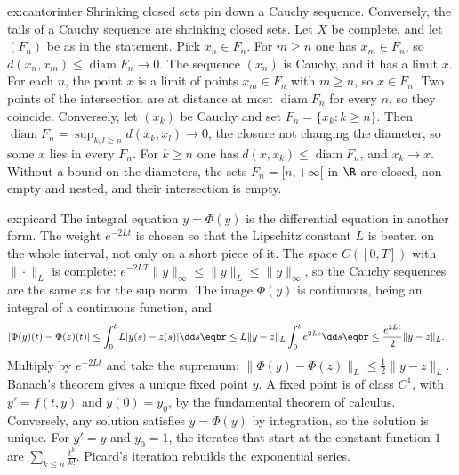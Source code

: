 \begin{solution}{ex:cantorinter}
\idea Shrinking closed sets pin down a Cauchy sequence. Conversely, the tails of a Cauchy sequence are shrinking closed sets.
\writeup Let $X$ be complete, and let $(F_n)$ be as in the statement. Pick $x_n\in F_n$. For $m\ge n$ one has $x_m\in F_n$, so $d(x_n,x_m)\le\operatorname{diam}F_n\to0$. The sequence $(x_n)$ is Cauchy, and it has a limit $x$. For each $n$, the point $x$ is a limit of points $x_m\in F_n$ with $m\ge n$, so $x\in F_n$. Two points of the intersection are at distance at most $\operatorname{diam}F_n$ for every $n$, so they coincide. Conversely, let $(x_k)$ be Cauchy and set $F_n=\overline{\{x_k:k\ge n\}}$. Then $\operatorname{diam}F_n=\sup_{k,l\ge n}d(x_k,x_l)\to0$, the closure not changing the diameter, so some $x$ lies in every $F_n$. For $k\ge n$ one has $d(x,x_k)\le\operatorname{diam}F_n$, and $x_k\to x$. Without a bound on the diameters, the sets $F_n=[n,+\infty[$ in $\R$ are closed, non-empty and nested, and their intersection is empty.
\end{solution}

\begin{solution}{ex:picard}
\idea The integral equation $y=\Phi(y)$ is the differential equation in another form. The weight $e^{-2Lt}$ is chosen so that the Lipschitz constant $L$ is beaten on the whole interval, not only on a short piece of it.
\writeup The space $C([0,T])$ with $\|\cdot\|_L$ is complete: $e^{-2LT}\|y\|_\infty\le\|y\|_L\le\|y\|_\infty$, so the Cauchy sequences are the same as for the sup norm. The image $\Phi(y)$ is continuous, being an integral of a continuous function, and
\[
\begin{aligned}|\Phi(y)(t)-\Phi(z)(t)|&\le\int_0^t L|y(s)-z(s)|\dd s\eqbr\le L\|y-z\|_L\int_0^t e^{2Ls}\dd s\eqbr\le\frac{e^{2Lt}}2\|y-z\|_L.\end{aligned}
\]
Multiply by $e^{-2Lt}$ and take the supremum: $\|\Phi(y)-\Phi(z)\|_L\le\frac12\|y-z\|_L$. Banach's theorem gives a unique fixed point $y$. A fixed point is of class $C^1$, with $y'=f(t,y)$ and $y(0)=y_0$, by the fundamental theorem of calculus. Conversely, any solution satisfies $y=\Phi(y)$ by integration, so the solution is unique. For $y'=y$ and $y_0=1$, the iterates that start at the constant function $1$ are $\sum_{k\le n}\frac{t^k}{k!}$. Picard's iteration rebuilds the exponential series.
\end{solution}

